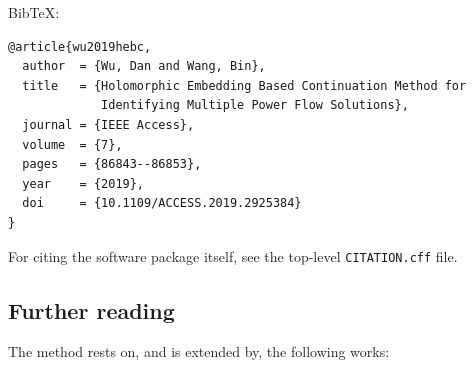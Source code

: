 \documentclass[11pt,a4paper]{article}
\newcommand{\code}[1]{\texttt{#1}}
\begin{document}
BibTeX:
\begin{lstlisting}[style=sh]
@article{wu2019hebc,
  author  = {Wu, Dan and Wang, Bin},
  title   = {Holomorphic Embedding Based Continuation Method for
             Identifying Multiple Power Flow Solutions},
  journal = {IEEE Access},
  volume  = {7},
  pages   = {86843--86853},
  year    = {2019},
  doi     = {10.1109/ACCESS.2019.2925384}
}
\end{lstlisting}

For citing the software package itself, see the top-level \code{CITATION.cff} file.

\subsection*{Further reading}
The method rests on, and is extended by, the following works:
\end{document}
